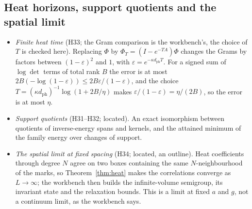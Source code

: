 \subsection{Heat horizons, support quotients and the spatial limit}

\begin{itemize}
\item \emph{Finite heat time} (H33; the Gram comparison is the workbench's, the choice of $T$ is checked here). Replacing $\Phi$ by $\Phi_T=(I-e^{-TA})\Phi$ changes the Grams by factors between $(1-\varepsilon)^2$ and $1$, with $\varepsilon=e^{-\kappa d_{\mathrm{ph}}T}$. For a signed sum of $\log\det$ terms of total rank $B$ the error is at most $2B(-\log(1-\varepsilon))\le2B\varepsilon/(1-\varepsilon)$, and the choice $T=(\kappa d_{\mathrm{ph}})^{-1}\log(1+2B/\eta)$ makes $\varepsilon/(1-\varepsilon)=\eta/(2B)$, so the error is at most $\eta$.
\item \emph{Support quotients} (H31--H32; located). An exact isomorphism between quotients of inverse-energy spans and kernels, and the attained minimum of the family energy over changes of support.
\item \emph{The spatial limit at fixed spacing} (H34; located, an outline). Heat coefficients through degree $N$ agree on two boxes containing the same $N$-neighbourhood of the marks, so Theorem~\ref{thm:heat} makes the correlations converge as $L\to\infty$; the workbench then builds the infinite-volume semigroup, its invariant state and the relaxation bounds. This is a limit at fixed $a$ and $g$, not a continuum limit, as the workbench says.
\end{itemize}
